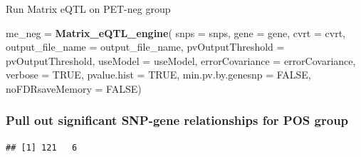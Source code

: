 \documentclass[]{article}
\newenvironment{Shaded}{\begin{snugshade}}{\end{snugshade}}
\newcommand{\KeywordTok}[1]{\textcolor[rgb]{0.13,0.29,0.53}{\textbf{#1}}}
\newcommand{\DataTypeTok}[1]{\textcolor[rgb]{0.13,0.29,0.53}{#1}}
\newcommand{\FloatTok}[1]{\textcolor[rgb]{0.00,0.00,0.81}{#1}}
\newcommand{\StringTok}[1]{\textcolor[rgb]{0.31,0.60,0.02}{#1}}
\newcommand{\CommentTok}[1]{\textcolor[rgb]{0.56,0.35,0.01}{\textit{#1}}}
\newcommand{\OtherTok}[1]{\textcolor[rgb]{0.56,0.35,0.01}{#1}}
\newcommand{\OperatorTok}[1]{\textcolor[rgb]{0.81,0.36,0.00}{\textbf{#1}}}
\newcommand{\NormalTok}[1]{#1}
\begin{document}
Run Matrix eQTL on PET-neg group

\begin{Shaded}
\begin{Highlighting}[]
\NormalTok{ me_neg =}\StringTok{ }\KeywordTok{Matrix_eQTL_engine}\NormalTok{(}
    \DataTypeTok{snps =}\NormalTok{ snps,}
    \DataTypeTok{gene =}\NormalTok{ gene,}
    \DataTypeTok{cvrt =}\NormalTok{ cvrt,}
    \DataTypeTok{output_file_name =}\NormalTok{ output_file_name,}
    \DataTypeTok{pvOutputThreshold =}\NormalTok{ pvOutputThreshold,}
    \DataTypeTok{useModel =}\NormalTok{ useModel, }
    \DataTypeTok{errorCovariance =}\NormalTok{ errorCovariance, }
    \DataTypeTok{verbose =} \OtherTok{TRUE}\NormalTok{,}
    \DataTypeTok{pvalue.hist =} \OtherTok{TRUE}\NormalTok{,}
    \DataTypeTok{min.pv.by.genesnp =} \OtherTok{FALSE}\NormalTok{,}
    \DataTypeTok{noFDRsaveMemory =} \OtherTok{FALSE}\NormalTok{)}
\end{Highlighting}
\end{Shaded}

\subsubsection{Pull out significant SNP-gene relationships for POS
group}\label{pull-out-significant-snp-gene-relationships-for-pos-group}

\begin{Shaded}
\end{Shaded}

\begin{verbatim}
## [1] 121   6
\end{verbatim}
\end{document}
